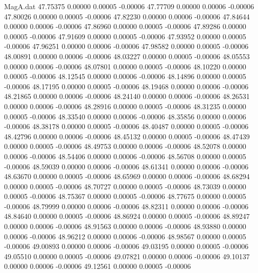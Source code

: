 \begin{filecontents}{MagA.dat}
  47.75375    0.00000    0.00005   -0.00006
  47.77709    0.00000    0.00006   -0.00006
  47.80026    0.00000    0.00005   -0.00006
  47.82230    0.00000    0.00006   -0.00006
  47.84644    0.00000    0.00006   -0.00006
  47.86960    0.00000    0.00005   -0.00006
  47.89286    0.00000    0.00005   -0.00006
  47.91609    0.00000    0.00005   -0.00006
  47.93952    0.00000    0.00005   -0.00006
  47.96251    0.00000    0.00006   -0.00006
  47.98582    0.00000    0.00005   -0.00006
  48.00891    0.00000    0.00006   -0.00006
  48.03227    0.00000    0.00005   -0.00006
  48.05553    0.00000    0.00006   -0.00006
  48.07801    0.00000    0.00005   -0.00006
  48.10220    0.00000    0.00005   -0.00006
  48.12545    0.00000    0.00006   -0.00006
  48.14896    0.00000    0.00005   -0.00006
  48.17195    0.00000    0.00005   -0.00006
  48.19468    0.00000    0.00006   -0.00006
  48.21865    0.00000    0.00006   -0.00006
  48.24140    0.00000    0.00006   -0.00006
  48.26531    0.00000    0.00006   -0.00006
  48.28916    0.00000    0.00005   -0.00006
  48.31235    0.00000    0.00005   -0.00006
  48.33540    0.00000    0.00006   -0.00006
  48.35856    0.00000    0.00006   -0.00006
  48.38178    0.00000    0.00005   -0.00006
  48.40487    0.00000    0.00005   -0.00006
  48.42796    0.00000    0.00006   -0.00006
  48.45132    0.00000    0.00005   -0.00006
  48.47439    0.00000    0.00005   -0.00006
  48.49753    0.00000    0.00006   -0.00006
  48.52078    0.00000    0.00006   -0.00006
  48.54406    0.00000    0.00006   -0.00006
  48.56708    0.00000    0.00005   -0.00006
  48.59039    0.00000    0.00006   -0.00006
  48.61341    0.00000    0.00006   -0.00006
  48.63670    0.00000    0.00005   -0.00006
  48.65969    0.00000    0.00006   -0.00006
  48.68294    0.00000    0.00005   -0.00006
  48.70727    0.00000    0.00005   -0.00006
  48.73039    0.00000    0.00005   -0.00006
  48.75367    0.00000    0.00005   -0.00006
  48.77675    0.00000    0.00005   -0.00006
  48.79999    0.00000    0.00006   -0.00006
  48.82311    0.00000    0.00006   -0.00006
  48.84640    0.00000    0.00005   -0.00006
  48.86924    0.00000    0.00005   -0.00006
  48.89247    0.00000    0.00006   -0.00006
  48.91563    0.00000    0.00006   -0.00006
  48.93880    0.00000    0.00006   -0.00006
  48.96212    0.00000    0.00006   -0.00006
  48.98567    0.00000    0.00005   -0.00006
  49.00893    0.00000    0.00006   -0.00006
  49.03195    0.00000    0.00005   -0.00006
  49.05510    0.00000    0.00005   -0.00006
  49.07821    0.00000    0.00006   -0.00006
  49.10137    0.00000    0.00006   -0.00006
  49.12561    0.00000    0.00005   -0.00006

\end{filecontents}
